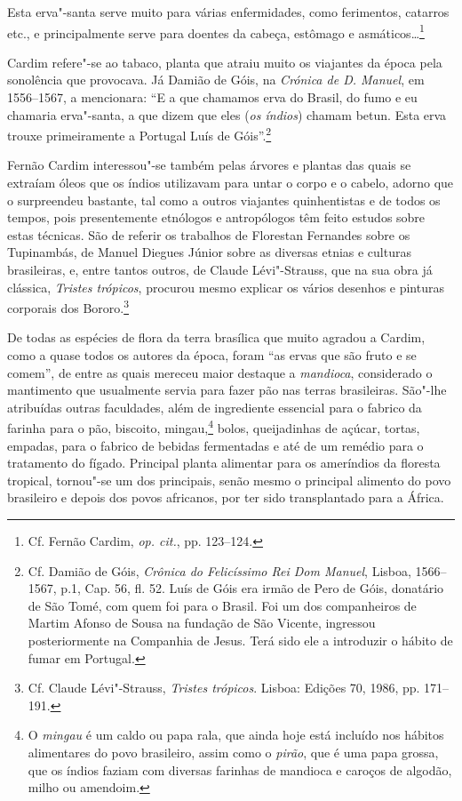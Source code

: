 \begin{hedraquote}
Esta erva"-santa serve muito para várias enfermidades, como
ferimentos, catarros etc., e principalmente serve para doentes da
cabeça, estômago e asmáticos\ldots{}\footnote{ Cf. Fernão Cardim, \textit{op. cit.}, pp. 123--124.} 
\end{hedraquote}

 Cardim refere"-se ao tabaco, planta que atraiu muito os
viajantes da época pela sonolência que provocava. Já Damião de Góis, na
\textit{Crónica de D. Manuel}, em 1556--1567, a mencionara: ``E
a que chamamos erva do Brasil, do fumo e eu chamaria erva"-santa, a que
dizem que eles (\textit{os índios}) chamam betun. Esta erva
trouxe primeiramente a Portugal Luís de Góis''.\footnote{ Cf. Damião 
de Góis, \textit{Crônica do Felicíssimo Rei Dom Manuel}, 
Lisboa, 1566--1567, p.1, Cap. 56, fl. 52. Luís de Góis era irmão de
Pero de Góis, donatário de São Tomé, com quem foi para o Brasil. Foi um
dos companheiros de Martim Afonso de Sousa na fundação de São Vicente,
ingressou posteriormente na Companhia de Jesus. Terá sido ele a
introduzir o hábito de fumar em Portugal.}

 Fernão Cardim interessou"-se também pelas árvores
e plantas das quais se extraíam óleos que os índios utilizavam para
untar o corpo e o cabelo, adorno que o surpreendeu bastante, tal como a
outros viajantes quinhentistas e de todos os tempos, pois presentemente
etnólogos e antropólogos têm feito estudos sobre estas técnicas. São de
referir os trabalhos de Florestan Fernandes sobre os Tupinambás, de
Manuel Diegues Júnior sobre as diversas etnias e culturas brasileiras,
e, entre tantos outros, de Claude Lévi"-Strauss, que na sua obra já
clássica, \textit{Tristes trópicos}, procurou mesmo explicar os vários
desenhos e pinturas corporais dos Bororo.\footnote{ Cf. Claude
Lévi"-Strauss, \textit{Tristes trópicos}. Lisboa: Edições
70, 1986, pp. 171--191.}
 
 De todas as espécies de flora da terra brasílica que muito
agradou a Cardim, como a quase todos os autores da época, foram
``as ervas que são fruto e se comem'', de entre as quais mereceu
maior destaque a \textit{mandioca}, considerado o mantimento que
usualmente servia para fazer pão nas terras brasileiras. São"-lhe
atribuídas outras faculdades, além de ingrediente essencial para o
fabrico da farinha para o pão, biscoito, mingau,\footnote{ O \textit{mingau} 
é um caldo ou papa rala, que ainda hoje está incluído
nos hábitos alimentares do povo brasileiro, assim como o
\textit{pirão}, que é uma papa grossa, que os índios faziam com
diversas farinhas de mandioca e caroços de algodão, milho ou
amendoim.} bolos, queijadinhas de açúcar, tortas, empadas, para o
fabrico de bebidas fermentadas e até de um remédio para o tratamento
do fígado. Principal planta alimentar para os ameríndios da floresta
tropical, tornou"-se um dos principais, senão mesmo o principal
alimento do povo brasileiro e depois dos povos africanos, por ter sido
transplantado para a África.

